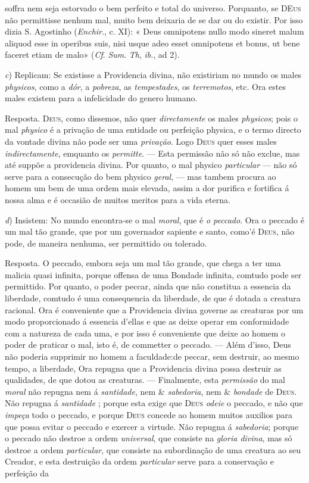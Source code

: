 soffra nem seja estorvado o bem perfeito e total do universo. Porquanto, se \textsc{DEus} não permittisse nenhum mal, muito bem deixaria de se dar ou do existir. Por isso dizia S. Agostinho (\emph{Enchir}., c. XI): « Deus omnipotens nullo modo sineret malum aliquod esse in operibus suis, nisi usque adeo esset omnipotens et bonus, ut bene faceret etiam de malo» (\emph{Cf}. \emph{Sum}. \emph{Th}, \emph{ib}., ad 2).\par \emph{c}) Replicam: Se existisse a Providencia divina, não existiriam no mundo os males \emph{physicos}, como a \emph{dór}, a \emph{pobreza}, as \emph{tempestades}, os \emph{terremotos}, etc. Ora estes males existem para a infelicidade do genero humano.\par Resposta. \textsc{Deus}, como dissemos, não quer \emph{directamente} os males \emph{physicos}; pois o mal \emph{physico} é a privação de uma entidade ou perfeição physica, e o termo directo da vontade divina não pode ser uma \emph{privação}. Logo \textsc{Deus} quer esses males \emph{indirectamente}, emquanto os \emph{permitte}. --- Esta permissão não só não exclue, mas até suppõe a providencia divina. Por quanto, o mal physico \emph{particular} --- não só serve para a consecução do bem physico \emph{geral}, --- mas tambem procura ao homem um bem de uma ordem mais elevada, assim a dor purifica e fortifica á nossa alma e é occasião de muitos meritos para a vida eterna.\par \emph{d}) Insistem: No mundo encontra-se o mal \emph{moral}, que é \emph{o peccado}. Ora o peccado é um mal tão grande, que por um governador sapiente e santo, como'é \textsc{Deus}, não pode, de maneira nenhuma, ser permittido ou tolerado.\par Resposta. O peccado, embora seja um mal tão grande, que chega a ter uma malicia quasi infinita, porque offensa de uma Bondade infinita, comtudo pode ser permittido. Por quanto, o poder peccar, ainda que não constitua a essencia da liberdade, comtudo é uma consequencia da liberdade, de que é dotada a creatura racional. Ora é conveniente que a Providencia divina governe as creaturas por um modo proporcionado á essencia d'ellas e que as deixe operar em conformidade com a natureza de cada uma, e por isso é conveniente que deixe ao homem o poder de praticar o mal, isto é, de commetter o peccado. --- Além d'isso, Deus não poderia supprimir no homem a faculdade:de peccar, sem destruir, ao mesmo tempo, a liberdade, Ora repugna que a Providencia divina possa destruir as qualidades, de que dotou as creaturas. --- Finalmente, esta \emph{permissão} do mal \emph{moral} não repugna nem á \emph{santidade}, nem \& \emph{sabedoria}, nem \& \emph{bondade} de \textsc{Deus}. Não repugna á \emph{santidade} ; porque esta exige que \textsc{Deus} \emph{odeie} o peccado, e não que \emph{impeça} todo o peccado, e porque \textsc{Deus} concede ao homem muitos auxilios para que possa evitar o peccado e exercer a virtude. Não repugna á \emph{sabedoria}; porque o peccado não destroe a ordem \emph{universal}, que consiste na \emph{gloria divina}, mas só destroe a ordem \emph{particular}, que consiste na subordinação de uma creatura ao seu Creador, e esta destruição da ordem \emph{particular} serve para a conservação e perfeição da 